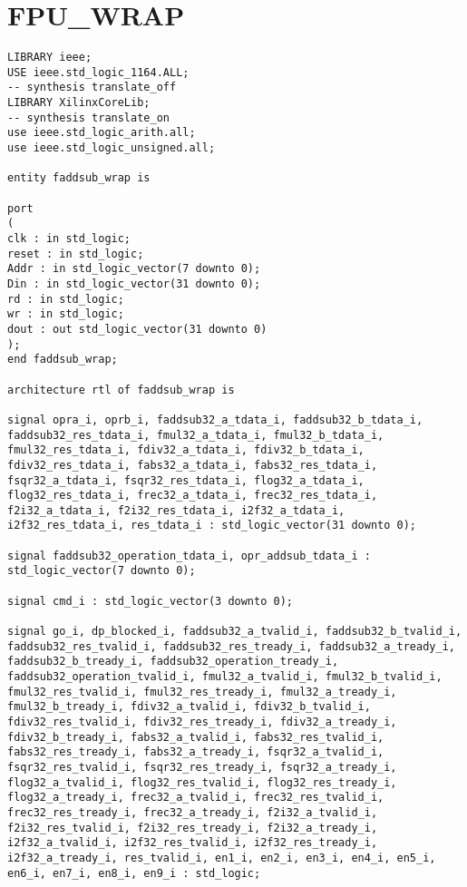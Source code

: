 \documentclass[conference]{IEEEtran}
\begin{document}
\section{FPU\_WRAP}
	\begin{lstlisting}	
LIBRARY ieee;
USE ieee.std_logic_1164.ALL;
-- synthesis translate_off
LIBRARY XilinxCoreLib;
-- synthesis translate_on
use ieee.std_logic_arith.all;
use ieee.std_logic_unsigned.all;

entity faddsub_wrap is

port
(
clk : in std_logic;
reset : in std_logic;
Addr : in std_logic_vector(7 downto 0);
Din : in std_logic_vector(31 downto 0);
rd : in std_logic;
wr : in std_logic;
dout : out std_logic_vector(31 downto 0)
);
end faddsub_wrap;

architecture rtl of faddsub_wrap is 

signal opra_i, oprb_i, faddsub32_a_tdata_i, faddsub32_b_tdata_i, faddsub32_res_tdata_i, fmul32_a_tdata_i, fmul32_b_tdata_i, fmul32_res_tdata_i, fdiv32_a_tdata_i, fdiv32_b_tdata_i, fdiv32_res_tdata_i, fabs32_a_tdata_i, fabs32_res_tdata_i, fsqr32_a_tdata_i, fsqr32_res_tdata_i, flog32_a_tdata_i, flog32_res_tdata_i, frec32_a_tdata_i, frec32_res_tdata_i, f2i32_a_tdata_i, f2i32_res_tdata_i, i2f32_a_tdata_i, i2f32_res_tdata_i, res_tdata_i : std_logic_vector(31 downto 0);

signal faddsub32_operation_tdata_i, opr_addsub_tdata_i : std_logic_vector(7 downto 0);

signal cmd_i : std_logic_vector(3 downto 0);

signal go_i, dp_blocked_i, faddsub32_a_tvalid_i, faddsub32_b_tvalid_i, faddsub32_res_tvalid_i, faddsub32_res_tready_i, faddsub32_a_tready_i, faddsub32_b_tready_i, faddsub32_operation_tready_i, faddsub32_operation_tvalid_i, fmul32_a_tvalid_i, fmul32_b_tvalid_i, fmul32_res_tvalid_i, fmul32_res_tready_i, fmul32_a_tready_i, fmul32_b_tready_i, fdiv32_a_tvalid_i, fdiv32_b_tvalid_i, fdiv32_res_tvalid_i, fdiv32_res_tready_i, fdiv32_a_tready_i, fdiv32_b_tready_i, fabs32_a_tvalid_i, fabs32_res_tvalid_i, fabs32_res_tready_i, fabs32_a_tready_i, fsqr32_a_tvalid_i, fsqr32_res_tvalid_i, fsqr32_res_tready_i, fsqr32_a_tready_i, flog32_a_tvalid_i, flog32_res_tvalid_i, flog32_res_tready_i, flog32_a_tready_i, frec32_a_tvalid_i, frec32_res_tvalid_i, frec32_res_tready_i, frec32_a_tready_i, f2i32_a_tvalid_i, f2i32_res_tvalid_i, f2i32_res_tready_i, f2i32_a_tready_i, i2f32_a_tvalid_i, i2f32_res_tvalid_i, i2f32_res_tready_i, i2f32_a_tready_i, res_tvalid_i, en1_i, en2_i, en3_i, en4_i, en5_i, en6_i, en7_i, en8_i, en9_i : std_logic;


\end{lstlisting}
\end{document}
